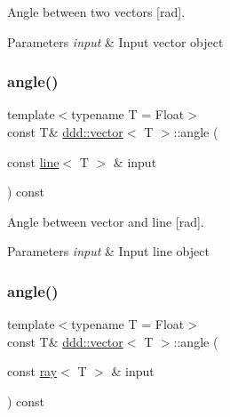 Angle between two vectors \mbox{[}rad\mbox{]}. 


\begin{DoxyParams}{Parameters}
{\em input} & Input vector object \\
\hline
\end{DoxyParams}
\mbox{\label{classddd_1_1vector_a97a1359914c22ea1e3928f02fc650bac}} 
\subsubsection{\texorpdfstring{angle()}{angle()}\hspace{0.1cm}{\footnotesize\ttfamily [2/4]}}
{\footnotesize\ttfamily template$<$typename T = Float$>$ \\
const T\& \hyperlink{classddd_1_1vector}{ddd\+::vector}$<$ T $>$\+::angle (\begin{DoxyParamCaption}\item[{const \hyperlink{classddd_1_1line}{line}$<$ T $>$ \&}]{input }\end{DoxyParamCaption}) const\hspace{0.3cm}{\ttfamily [inline]}}



Angle between vector and line \mbox{[}rad\mbox{]}. 


\begin{DoxyParams}{Parameters}
{\em input} & Input line object \\
\hline
\end{DoxyParams}
\mbox{\label{classddd_1_1vector_a893bfd1b0209a0a7e7630a3ddf38193d}} 
\subsubsection{\texorpdfstring{angle()}{angle()}\hspace{0.1cm}{\footnotesize\ttfamily [3/4]}}
{\footnotesize\ttfamily template$<$typename T = Float$>$ \\
const T\& \hyperlink{classddd_1_1vector}{ddd\+::vector}$<$ T $>$\+::angle (\begin{DoxyParamCaption}\item[{const \hyperlink{classddd_1_1ray}{ray}$<$ T $>$ \&}]{input }\end{DoxyParamCaption}) const\hspace{0.3cm}{\ttfamily [inline]}}




